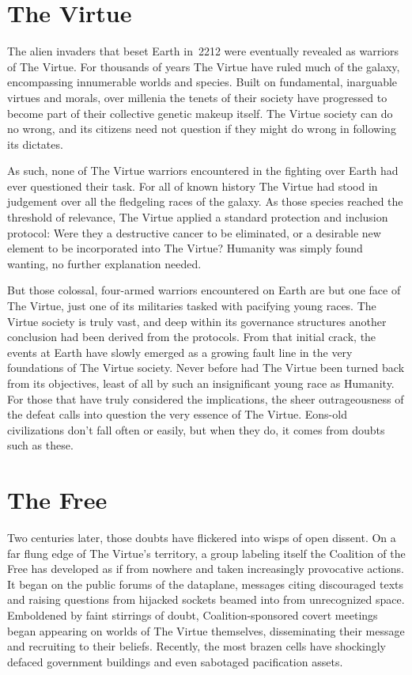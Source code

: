 \section{The Virtue}

The alien invaders that beset Earth in~2212 were eventually revealed
as warriors of The Virtue.  For thousands of years The Virtue have
ruled much of the galaxy, encompassing innumerable worlds and species.
Built on fundamental, inarguable virtues and morals, over millenia the
tenets of their society have progressed to become part of their
collective genetic makeup itself.  The Virtue society can do no wrong,
and its citizens need not question if they might do wrong in following
its dictates.

As such, none of The Virtue warriors encountered in the fighting over
Earth had ever questioned their task.  For all of known history The
Virtue had stood in judgement over all the fledgeling races of the
galaxy.  As those species reached the threshold of relevance, The
Virtue applied a standard protection and inclusion protocol: Were they
a destructive cancer to be eliminated, or a desirable new element to
be incorporated into The Virtue?  Humanity was simply found wanting,
no further explanation needed.

But those colossal, four-armed warriors encountered on Earth are but
one face of The Virtue, just one of its militaries tasked with
pacifying young races.  The Virtue society is truly vast, and deep
within its governance structures another conclusion had been derived
from the protocols.  From that initial crack, the events at Earth have
slowly emerged as a growing fault line in the very foundations of The
Virtue society.  Never before had The Virtue been turned back from its
objectives, least of all by such an insignificant young race as
Humanity.  For those that have truly considered the implications, the
sheer outrageousness of the defeat calls into question the very
essence of The Virtue.  Eons-old civilizations don't fall often or
easily, but when they do, it comes from doubts such as these.

\section{The Free}

Two centuries later, those doubts have flickered into wisps of open
dissent.  On a far flung edge of The Virtue's territory, a group
labeling itself the Coalition of the Free has developed as if from
nowhere and taken increasingly provocative actions.  It began on the
public forums of the dataplane, messages citing discouraged texts and
raising questions from hijacked sockets beamed into from unrecognized
space.  Emboldened by faint stirrings of doubt, Coalition-sponsored
covert meetings began appearing on worlds of The Virtue themselves,
disseminating their message and recruiting to their beliefs.
Recently, the most brazen cells have shockingly defaced government
buildings and even sabotaged pacification assets.

